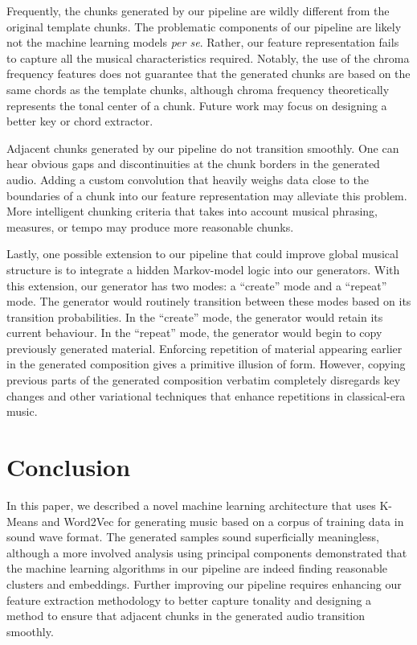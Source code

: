 \documentclass{article}
\begin{document}
Frequently, the chunks generated by our pipeline are wildly different from the original template chunks. The problematic components of our pipeline are likely not the machine learning models \textit{per se}. Rather, our feature representation fails to capture all the musical characteristics required. Notably, the use of the chroma frequency features does not guarantee that the generated chunks are based on the same chords as the template chunks, although chroma frequency theoretically represents the tonal center of a chunk. Future work may focus on designing a better key or chord extractor.

Adjacent chunks generated by our pipeline do not transition smoothly. One can hear obvious gaps and discontinuities at the chunk borders in the generated audio. Adding a custom convolution that heavily weighs data close to the boundaries of a chunk into our feature representation may alleviate this problem. More intelligent chunking criteria that takes into account musical phrasing, measures, or tempo may produce more reasonable chunks.

Lastly, one possible extension to our pipeline that could improve global musical structure is to integrate a hidden Markov-model logic into our generators. With this extension, our generator has two modes: a ``create'' mode and a ``repeat'' mode. The generator would routinely transition between these modes based on its transition probabilities. In the ``create'' mode, the generator would retain its current behaviour. In the ``repeat'' mode, the generator would begin to copy previously generated material. Enforcing repetition of material appearing earlier in the generated composition gives a primitive illusion of form. However, copying previous parts of the generated composition verbatim completely disregards key changes and other variational techniques that enhance repetitions in classical-era music.

\section{Conclusion}

In this paper, we described a novel machine learning architecture that uses K-Means and Word2Vec for generating music based on a corpus of training data in sound wave format. The generated samples sound superficially meaningless, although a more involved analysis using principal components demonstrated that the machine learning algorithms in our pipeline are indeed finding reasonable clusters and embeddings. Further improving our pipeline requires enhancing our feature extraction methodology to better capture tonality and designing a method to ensure that adjacent chunks in the generated audio transition smoothly.


\end{document}
